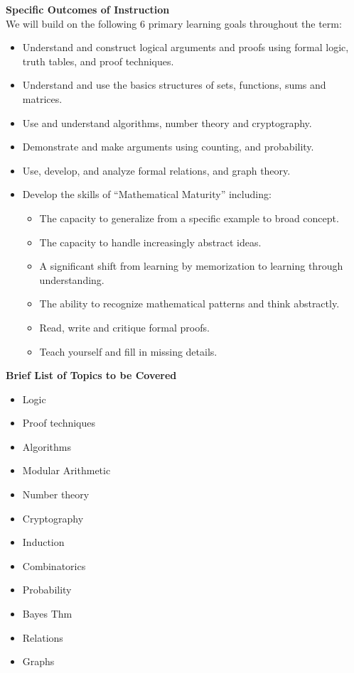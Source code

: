\documentclass{article}
\begin{document}
\noindent \textbf{Specific Outcomes of Instruction} \\
We will build on the following 6 primary learning goals throughout the term:
\begin{itemize}
    \item Understand and construct logical arguments and proofs using formal logic, truth tables, and proof techniques.
    \item Understand and use the basics structures of sets, functions, sums and matrices.
    \item Use and understand algorithms, number theory and cryptography.
    \item Demonstrate and make arguments using counting, and probability.
    \item Use, develop, and analyze formal relations, and graph theory.
    \item Develop the skills of “Mathematical Maturity” including:
    \begin{itemize}
        \item The capacity to generalize from a specific example to broad concept.
        \item The capacity to handle increasingly abstract ideas.
        \item A significant shift from learning by memorization to learning through understanding.
        \item The ability to recognize mathematical patterns and think abstractly.
        \item Read, write and critique formal proofs.
        \item Teach yourself and fill in missing details.
    \end{itemize}
\end{itemize}

\noindent \textbf{Brief List of Topics to be Covered}
\begin{itemize}
    \item Logic
    \item Proof techniques
    \item Algorithms
    \item Modular Arithmetic
    \item Number theory
    \item Cryptography
    \item Induction
    \item Combinatorics
    \item Probability
    \item Bayes Thm
    \item Relations
    \item Graphs
\end{itemize}
\end{document}

